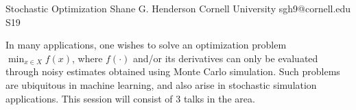 

\clearpage

\begin{session}
 {Stochastic Optimization}%
 {Shane G. Henderson}%
 {Cornell University}%
 {sgh9@cornell.edu}%
{}{}{}
 {S19}%
{}

 In many applications, one wishes to solve an optimization problem
 $\min_{x \in X} f(x)$, where $f(\cdot)$ and/or its derivatives can
 only be evaluated through noisy estimates obtained using Monte Carlo
 simulation. Such problems are ubiquitous in machine learning, and also
 arise in stochastic simulation applications. This session will consist
 of 3 talks in the area.
\end{session}



\clearpage

